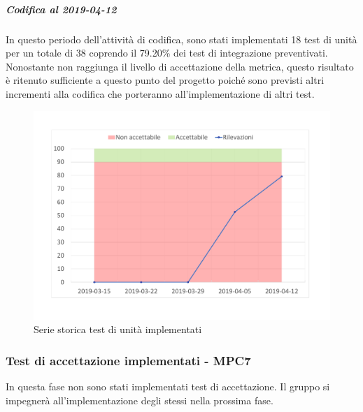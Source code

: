 \subparagraph{Codifica al 2019-04-12}
In questo periodo dell'attività di codifica, sono stati implementati 18 test di unità per un totale di 38 coprendo il 79.20\% dei test di integrazione preventivati.
Nonostante non raggiunga il livello di accettazione della
metrica, questo risultato è ritenuto sufficiente a questo punto del progetto poiché sono previsti altri incrementi alla codifica che porteranno all'implementazione di altri test.

\begin{figure}[H]
	\centering
	\includegraphics[scale=0.6]{images/resoconto/MPC6Chart.pdf}
	\caption{Serie storica test di unità implementati}	
\end{figure}

\subsubsection{Test di accettazione implementati - MPC7}
In questa fase non sono stati implementati test di accettazione.
Il gruppo si impegnerà all'implementazione degli stessi nella prossima fase.
\newpage
